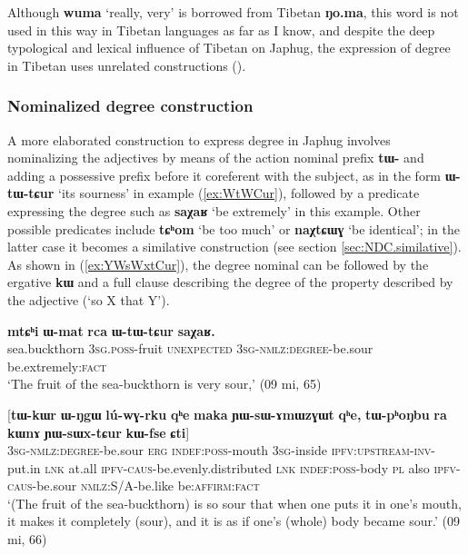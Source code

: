 \documentclass[oneside,a4paper,11pt]{article}
\newcommand{\ipa}[1]{{\phon\textbf{#1}}} %
\newcommand{\forme}[2]{\ipa{#1} `#2'}
\begin{document}
Although \forme{wuma}{really, very} is borrowed from Tibetan \ipa{ŋo.ma}, this word is not used in this way in Tibetan languages as far as I know, and despite the deep typological and lexical influence of Tibetan on Japhug, the expression of degree in Tibetan uses unrelated constructions (\citealt{simon15evaluative}).

\subsubsection{Nominalized degree construction} \label{sec:NDC}
A more elaborated construction to express degree in Japhug involves nominalizing the adjectives by means of the action nominal prefix \ipa{tɯ-} and adding a possessive prefix before it coreferent with the subject, as in the form \forme{ɯ-tɯ-tɕur}{its sourness} in example (\ref{ex:WtWCur}), followed by a predicate expressing the degree such as  \forme{saχaʁ}{be extremely} in this example. Other possible predicates include \forme{tɕʰom}{be too much} or \forme{naχtɕɯɣ}{be identical}; in the latter case it becomes a similative construction (see section \ref{sec:NDC.similative}).  As shown in (\ref{ex:YWsWxtCur}), the degree nominal can be followed by the ergative \ipa{kɯ} and a full clause describing the degree of the property described by the adjective (`so X that Y').

\begin{exe}
\ex \label{ex:WtWCur}
\gll 
\ipa{mtɕʰi}  	\ipa{ɯ-mat}  	\ipa{rca}  	\ipa{ɯ-tɯ-tɕur}  	\ipa{saχaʁ.}  	   \\
sea.buckthorn \textsc{3sg.poss}-fruit \textsc{unexpected} \textsc{3sg-nmlz:degree}-be.sour be.extremely:\textsc{fact}   \\
\glt `The fruit of the sea-buckthorn is very sour,' (09 mi, 65)
\end{exe}

\begin{exe}
\ex \label{ex:YWsWxtCur}
\gll 
 	[\ipa{ɯ-tɯ-tɕur}]  	\ipa{\textbf{kɯ}}  	[\ipa{tɯ-kɯr}  	\ipa{ɯ-ŋgɯ}  	\ipa{lú-wɣ-rku}  	\ipa{qʰe}  	\ipa{maka}  	\ipa{ɲɯ-sɯ-ɤmɯzɣɯt}  	\ipa{qʰe,}  	\ipa{tɯ-pʰoŋbu}  	\ipa{ra}  	\ipa{kɯnɤ}  	\ipa{ɲɯ-sɯx-tɕur}  	\ipa{kɯ-fse}  	\ipa{ɕti}]  \\
  \textsc{3sg-nmlz:degree}-be.sour \textsc{erg} \textsc{indef:poss}-mouth \textsc{3sg}-inside \textsc{ipfv:upstream-inv}-put.in \textsc{lnk} at.all \textsc{ipfv-caus}-be.evenly.distributed \textsc{lnk} \textsc{indef:poss}-body \textsc{pl} also \textsc{ipfv-caus}-be.sour \textsc{nmlz:S/A}-be.like be:\textsc{affirm}:\textsc{fact} \\
\glt `(The fruit of the sea-buckthorn) is so sour that when one puts it in one's mouth, it makes it completely (sour), and it is as if one's (whole) body became sour.' (09 mi, 66)
\end{exe}
\end{document}
